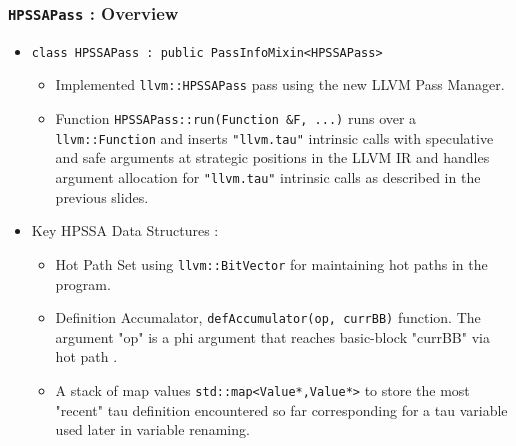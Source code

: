 \documentclass[aspectratio=169]{beamer}
\begin{document}
\begin{frame}
	\frametitle{\texttt{HPSSAPass} : Overview}
	\begin{itemize}
		\item \texttt{class HPSSAPass : public PassInfoMixin<HPSSAPass>}
		\begin{itemize}
			\footnotesize
			\item Implemented \texttt{llvm::HPSSAPass} pass using the new LLVM Pass Manager. 
			\item Function \texttt{HPSSAPass::run(Function &F, ...)}  runs over a \texttt{llvm::Function} and inserts \texttt{"llvm.tau"} intrinsic calls with speculative and safe arguments at strategic positions in the LLVM IR and handles argument allocation for  \texttt{"llvm.tau"} intrinsic calls as described in the previous slides.
		\end{itemize}
		\item Key HPSSA Data Structures :  
		\begin{itemize}
			\footnotesize
			\item Hot Path Set using \texttt{llvm::BitVector} for maintaining \color{red} hot paths \color{black} in the program.
			\item Definition Accumalator, \texttt{defAccumulator(op, currBB)} function. %
			The argument "op" is a phi argument that reaches basic-block "currBB" via \color{red} hot path \color{black}. 
			\item A stack of map values \texttt{std::map<Value*,Value*>} to store the most "recent" tau definition encountered so far corresponding for a tau variable used later in variable renaming. 
		\end{itemize}
	\end{itemize}
\end{frame}
\end{document}

